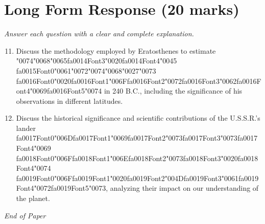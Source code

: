 \documentclass[12pt]{article}
\begin{document}
\section*{Long Form Response (20 marks)}
\textit{Answer each question with a clear and complete explanation.}
\begin{enumerate}[label=\arabic*.]
\setcounter{enumi}{10}
\item Discuss the methodology employed by Eratosthenes to estimate {\char"0074}{\char"0068}{\char"0065}{\csname fa0014Font3\endcsname\char"0020}{\csname fa0014Font4\endcsname\char"0045} {\csname fa0015Font0\endcsname\char"0061}{\char"0072}{\char"0074}{\char"0068}{\char"0027}{\char"0073} {\csname fa0016Font0\endcsname\char"0020}{\csname fa0016Font1\endcsname\char"006F}{\csname fa0016Font2\endcsname\char"0072}{\csname fa0016Font3\endcsname\char"0062}{\csname fa0016Font4\endcsname\char"0069}{\csname fa0016Font5\endcsname\char"0074} in 240 B.C.,
including the significance of his observations in different latitudes.
\item Discuss the historical significance and scientific contributions of the U.S.S.R.'s lander
{\csname fa0017Font0\endcsname\char"006D}{\csname fa0017Font1\endcsname\char"0069}{\csname fa0017Font2\endcsname\char"0073}{\csname fa0017Font3\endcsname\char"0073}{\csname fa0017Font4\endcsname\char"0069} {\csname fa0018Font0\endcsname\char"006F}{\csname fa0018Font1\endcsname\char"006E}{\csname fa0018Font2\endcsname\char"0073}{\csname fa0018Font3\endcsname\char"0020}{\csname fa0018Font4\endcsname\char"0074} {\csname fa0019Font0\endcsname\char"006F}{\csname fa0019Font1\endcsname\char"0020}{\csname fa0019Font2\endcsname\char"004D}{\csname fa0019Font3\endcsname\char"0061}{\csname fa0019Font4\endcsname\char"0072}{\csname fa0019Font5\endcsname\char"0073}, analyzing their impact on our understanding of the planet.
\end{enumerate}

\vfill
\noindent\textit{End of Paper}
\end{document}
